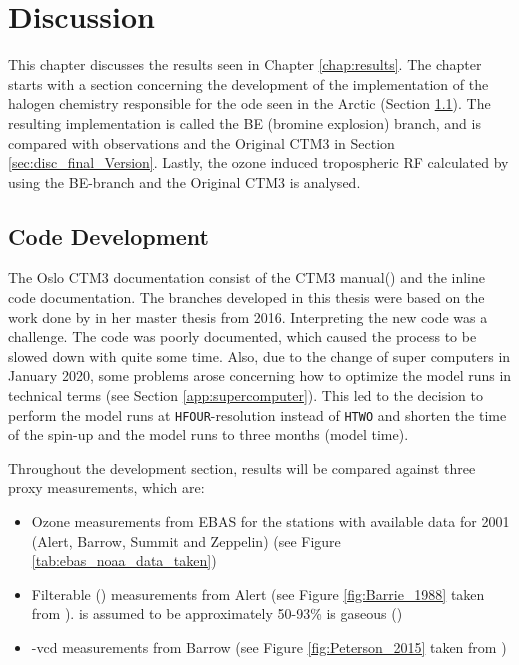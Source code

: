 \setcounter{chapter}{6}
\chapter{Discussion}\label{chap:discussion}

This chapter discusses the results seen in Chapter \ref{chap:results}. The chapter starts with a section concerning the development of the implementation of the halogen chemistry responsible for the \acrlong{ode} seen in the Arctic (Section \ref{sec:discussion_code_development}). The resulting implementation is called the BE (bromine explosion) branch, and is compared with observations and the Original CTM3 in Section \ref{sec:disc_final_Version}. Lastly, the ozone induced tropospheric RF calculated by using the BE-branch and the Original CTM3 is analysed. 


\section{Code Development}\label{sec:discussion_code_development}

The Oslo CTM3 documentation consist of the CTM3 manual(\cite{SovdeManual}) and the inline code documentation. The branches developed in this thesis were based on the work done by \cite{Susanne} in her master thesis from 2016. Interpreting the new code was a challenge. The code was poorly documented, which caused the process to be slowed down with quite some time. Also, due to the change of super computers in January 2020, some problems arose concerning how to optimize the model runs in technical terms (see Section \ref{app:supercomputer}). This led to the decision to perform the model runs at \texttt{HFOUR}-resolution instead of \texttt{HTWO} and shorten the time of the spin-up and the model runs to three months (model time). 

\medskip

Throughout the development section, results will be compared against three proxy measurements, which are: 

\begin{itemize}
    \item Ozone measurements from EBAS for the stations with available data for 2001 (Alert, Barrow, Summit and Zeppelin) (see Figure \ref{tab:ebas_noaa_data_taken})
    \item Filterable  () measurements from Alert (see Figure \ref{fig:Barrie_1988} taken from \cite{barrie}).  is assumed to be approximately 50-93\% is gaseous  (\cite{barrie})
    \item {}-\acrlong{vcd} measurements from Barrow (see Figure \ref{fig:Peterson_2015} taken from \cite{Peterson2015})
\end{itemize}

